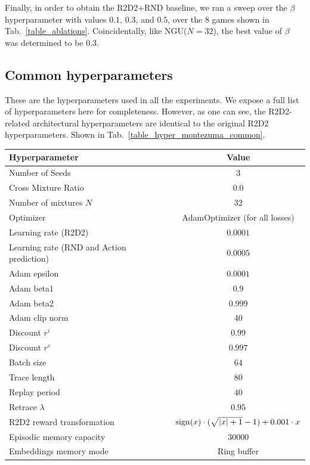 \documentclass{article} %
\begin{document}
Finally, in order to obtain the R2D2+RND baseline, we ran a sweep over the $\beta$ hyperparameter with values $0.1$, $0.3$, and $0.5$, over the $8$ games shown in Tab.~\ref{table_ablations}. Coincidentally, like NGU($N=32$), the best value of $\beta$ was determined to be $0.3$.

\subsection{Common hyperparameters}
\label{common_hyperparameters}
These are the hyperparameters used in all the experiments. We expose a full list of hyperparameters here for completeness. However, as one can see, the R2D2-related architectural hyperparameters are identical to the original R2D2 hyperparameters. Shown in Tab.~\ref{table_hyper_montezuma_common}.
\begin{small}
\begin{longtable}[h!]{l|c}
\centering
\textbf{Hyperparameter} & \textbf{Value} \\ \hline
Number of Seeds & $3$  \\ \hline
Cross Mixture Ratio & $0.0$ \\ \hline
Number of mixtures $N$ & $32$ \\ \hline
Optimizer & AdamOptimizer (for all losses) \\ \hline
Learning rate (R2D2) & $0.0001$  \\ \hline
Learning rate (RND and Action prediction) & $0.0005$ \\ \hline
Adam epsilon & $0.0001$  \\ \hline
Adam beta1 & $0.9$  \\ \hline
Adam beta2 & $0.999$  \\ \hline
Adam clip norm & $40$  \\ \hline
Discount $r^i$ & $0.99$ \\ \hline
Discount $r^e$ & $0.997$ \\ \hline
Batch size & $64$ \\ \hline
Trace length & $80$ \\ \hline
Replay period & $40$ \\ \hline
Retrace $\lambda$ & $0.95$ \\ \hline
R2D2 reward transformation & ${\rm sign}(x) \cdot (\sqrt{|x| + 1} - 1) + 0.001 \cdot x$ \\ \hline
Episodic memory capacity & $30000$ \\ \hline
Embeddings memory mode & Ring buffer\\ \hline

\end{longtable}
\end{small}
\end{document}
